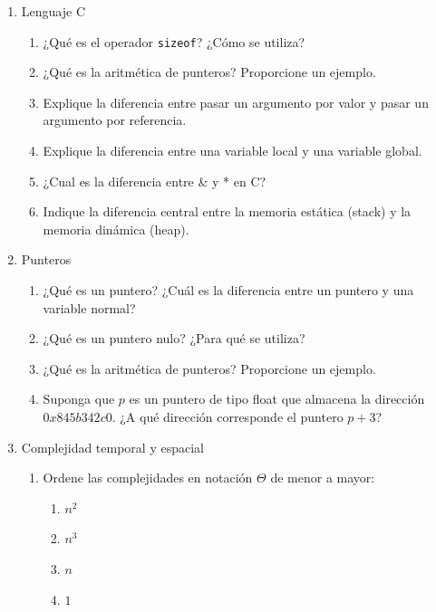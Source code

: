 \documentclass[12pt]{article}
\begin{document}
\begin{titlepage}
        \begin{enumerate}
            \item Lenguaje C
            \begin{enumerate}[label*=\arabic*.]
                \item ¿Qué es el operador \texttt{sizeof}? ¿Cómo se utiliza?
                \item ¿Qué es la aritmética de punteros? Proporcione un ejemplo.
                \item Explique la diferencia entre pasar un argumento por valor y pasar un argumento por referencia.
                \item Explique la diferencia entre una variable local y una variable global.
                \item ¿Cual es la diferencia entre \& y * en C?
                \item Indique la diferencia central entre la memoria estática (stack) y la memoria dinámica (heap).
            \end{enumerate}    
            \item Punteros
            \begin{enumerate}[label*=\arabic*.]
                \item ¿Qué es un puntero? ¿Cuál es la diferencia entre un puntero y una variable normal?
                \item ¿Qué es un puntero nulo? ¿Para qué se utiliza?
                \item ¿Qué es la aritmética de punteros? Proporcione un ejemplo.
                \item Suponga que $p$ es un puntero de tipo float que almacena la dirección $0x845b342c0$. ¿A qué dirección corresponde el puntero $p+3$?
            \end{enumerate}
            \item Complejidad temporal y espacial
            \begin{enumerate}[label*=\arabic*.]
                \item Ordene las complejidades en notación $\Theta$ de menor a mayor:
                \begin{multicols}{3}
                \begin{enumerate}
                    \item $n^2$
                    \item $n^3$
                    \item $n$
                    \item $1$

\end{enumerate}
\end{multicols}
\end{enumerate}
\end{enumerate}
\end{titlepage}
\end{document}
